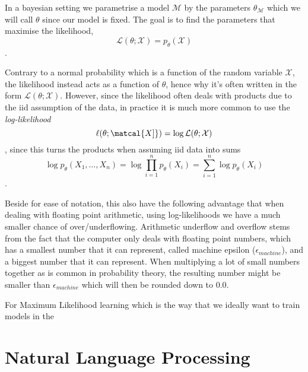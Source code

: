 In a bayesian setting we parametrise a model $\mathcal{M}$ by the parameters
$\theta_{\mathcal{M}}$ which we will call $\theta$ since our model is fixed. The
goal is to find the parameters that maximise the likelihood,
\begin{equation}
  \label{eq:likelihood}
  \mathcal{L}(\theta; \mathcal{X}) = p_{\theta}(\mathcal{X})
\end{equation}.

Contrary to a normal probability which is a function of the random variable
$\mathcal{X}$, the likelihood instead acts as a function of $\theta$, hence why
it's often written in the form $\mathcal{L}(\theta; \mathcal{X})$. However,
since the likelihood often deals with products due to the iid assumption of the
data, in practice it is much more common to use the \textit{log-likelihood}
\begin{equation}
  \label{eq:log_likelihood}
  \ell(\theta; \matcal{X]}) = \log \mathcal{L}(\theta; \mathcal{X})
\end{equation},
since this turns the products when assuming iid data into sums
\begin{equation*}
  \log p_{\theta}(X_1, \dots, X_n) = \log \prod_{i = 1}^n p_{\theta}(X_i) = \sum_{i = 1}^n \log p_{\theta}(X_i)
\end{equation*}.

Beside for ease of notation, this also have the following advantage that when
dealing with floating point arithmetic, using log-likelihoods we have a much
smaller chance of over/underflowing. Arithmetic underflow and overflow stems
from the fact that the computer only deals with floating point numbers, which
has a smallest number that it can represent, called machine epsilon
($\epsilon_{machine}$), and a biggest number that it can represent. When
multiplying a lot of small numbers together as is common in probability theory,
the resulting number might be smaller than $\epsilon_{machine}$ which will then
be rounded down to $0.0$.

For Maximum Likelihood learning which is the way that we ideally want to train
models in the 


\section{Natural Language Processing}

